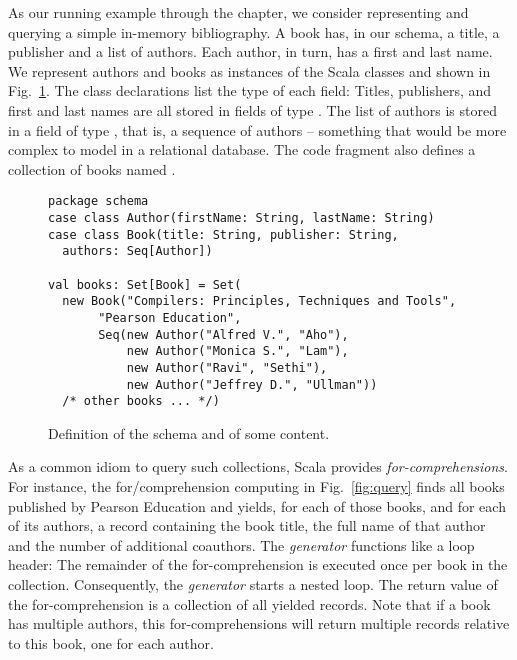 As our running example through the chapter, we consider representing and querying a simple in-memory bibliography. A book has, in our schema, a title, a publisher and a list of authors. Each author, in turn, has a first and last name. We represent authors and books as instances of the Scala classes  and  shown in Fig.~\ref{fig:schema}. The class declarations list the type of each field: Titles, publishers, and first and last names are all stored in fields of type . The list of authors is stored in a field of type , that is, a sequence of authors -- something that would be more complex to model in a relational database.
The code fragment also defines a collection of books named .
\begin{figure}[t]
\centering
\begin{lstlisting}
package schema
case class Author(firstName: String, lastName: String)
case class Book(title: String, publisher: String,
  authors: Seq[Author])

val books: Set[Book] = Set(
  new Book("Compilers: Principles, Techniques and Tools",
       "Pearson Education",
       Seq(new Author("Alfred V.", "Aho"),
           new Author("Monica S.", "Lam"),
           new Author("Ravi", "Sethi"),
           new Author("Jeffrey D.", "Ullman"))
  /* other books ... */)
\end{lstlisting}
\caption{Definition of the schema and of some content.}
\label{fig:schema}
\end{figure}

As a common idiom to query such collections, Scala provides \emph{for-comprehensions}.
For instance, the for\-/comprehension computing  in Fig.~\ref{fig:query} finds all books published by Pearson Education and yields, for each of those books, and for each of its authors, a record containing the book title, the full name of that author and the number of additional coauthors.
The \emph{generator}  functions like a loop header: The remainder of the for-comprehension is executed once per book in the collection. Consequently, the \emph{generator}  starts a nested loop.
The return value of the for-comprehension is a collection of all yielded
records. Note that if a book has multiple authors, this for-comprehensions will
return multiple records relative to this book, one for each author.

